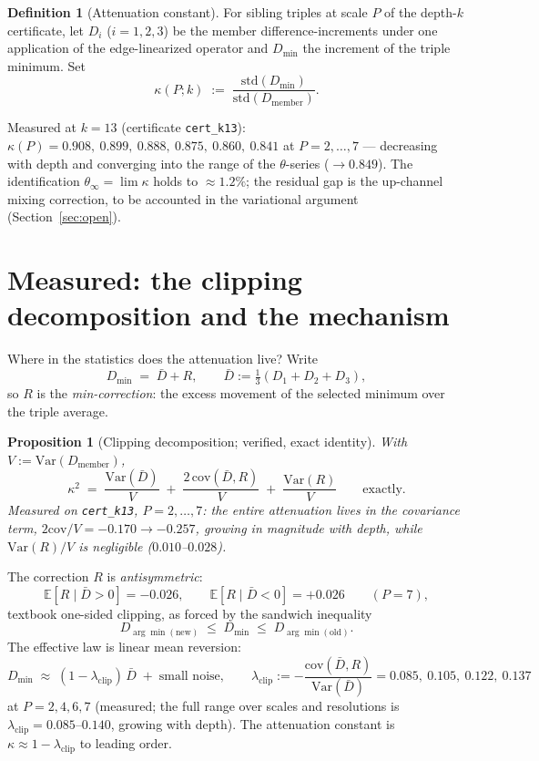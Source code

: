 \documentclass[11pt]{article}
\newtheorem{proposition}[theorem]{Proposition}
\theoremstyle{definition}
\newtheorem{definition}[theorem]{Definition}
\theoremstyle{remark}
\newcommand{\E}{\mathbb{E}}
\newcommand{\Var}{\mathrm{Var}}
\newcommand{\cov}{\mathrm{cov}}
\newcommand{\lam}{\lambda}
\newcommand{\kap}{\kappa}
\begin{document}
\begin{definition}[Attenuation constant]\label{def:kappa}
For sibling triples at scale $P$ of the depth-$k$ certificate, let
$D_i$ ($i = 1, 2, 3$) be the member difference-increments under one
application of the edge-linearized operator and $D_{\min}$ the increment
of the triple minimum. Set
\[
\kap(P; k) \;:=\;
\frac{\mathrm{std}(D_{\min})}{\mathrm{std}(D_{\mathrm{member}})} .
\]
\end{definition}

Measured at $k = 13$ (certificate \texttt{cert\_k13}):
$\kap(P) = 0.908,\ 0.899,\ 0.888,\ 0.875,\ 0.860,\ 0.841$ at
$P = 2, \ldots, 7$ --- decreasing with depth and converging into the range
of the $\theta$-series ($\to 0.849$). The identification
$\theta_\infty = \lim \kap$ holds to $\approx 1.2\%$; the residual gap is
the up-channel mixing correction, to be accounted in the variational
argument (Section~\ref{sec:open}).

\section{Measured: the clipping decomposition and the mechanism}
\label{sec:clipping}

Where in the statistics does the attenuation live? Write
\[
D_{\min} \;=\; \bar D + R,
\qquad \bar D := \tfrac13 (D_1 + D_2 + D_3),
\]
so $R$ is the \emph{min-correction}: the excess movement of the selected
minimum over the triple average.

\begin{proposition}[Clipping decomposition; verified, exact identity]
\label{prop:clipping}
With $V := \Var(D_{\mathrm{member}})$,
\begin{equation}
\kap^2 \;=\; \frac{\Var(\bar D)}{V}
\;+\; \frac{2\,\cov(\bar D, R)}{V}
\;+\; \frac{\Var(R)}{V}
\qquad \text{exactly.}
\label{eq:decomp}
\end{equation}
Measured on \texttt{cert\_k13}, $P = 2, \ldots, 7$: the \emph{entire}
attenuation lives in the covariance term, $2\cov/V = -0.170 \to -0.257$,
growing in magnitude with depth, while $\Var(R)/V$ is negligible
($0.010$--$0.028$).
\end{proposition}

The correction $R$ is \emph{antisymmetric}:
\[
\E[R \mid \bar D > 0] = -0.026, \qquad
\E[R \mid \bar D < 0] = +0.026 \qquad (P = 7),
\]
textbook one-sided clipping, as forced by the sandwich inequality
\begin{equation}
D_{\arg\min(\mathrm{new})} \;\leq\; D_{\min} \;\leq\;
D_{\arg\min(\mathrm{old})} .
\label{eq:sandwich}
\end{equation}
The effective law is linear mean reversion:
\begin{equation}
D_{\min} \;\approx\; (1 - \lam_{\mathrm{clip}})\, \bar D
\;+\; \text{small noise},
\qquad
\lam_{\mathrm{clip}} := -\frac{\cov(\bar D, R)}{\Var(\bar D)}
= 0.085,\ 0.105,\ 0.122,\ 0.137
\label{eq:effslope}
\end{equation}
at $P = 2, 4, 6, 7$ (measured; the full range over scales and
resolutions is $\lam_{\mathrm{clip}} = 0.085$--$0.140$, growing with
depth). The attenuation constant is $\kap \approx 1 - \lam_{\mathrm{clip}}$
to leading order.
\end{document}
